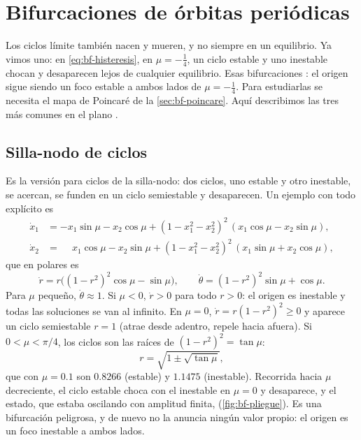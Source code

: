 \section{Bifurcaciones de órbitas periódicas}
\label{sec:bf-ciclos}

Los ciclos límite también nacen y mueren, y no siempre en un equilibrio. Ya vimos uno: en \eqref{eq:bf-histeresis}, en $\mu=-\tfrac14$, un ciclo estable y uno inestable chocan y desaparecen lejos de cualquier equilibrio. Esas bifurcaciones : el origen sigue siendo un foco estable a ambos lados de $\mu=-\tfrac14$. Para estudiarlas se necesita el mapa de Poincaré de la \cref{sec:bf-poincare}. Aquí describimos las tres más comunes en el plano \citep[\S8.4]{Str15}.

\subsection{Silla-nodo de ciclos}

Es la versión para ciclos de la silla-nodo: dos ciclos, uno estable y otro inestable, se acercan, se funden en un ciclo semiestable y desaparecen. Un ejemplo con todo explícito es \citep[cap.~7]{Sas99}
\begin{equation}
\begin{aligned}
  \dot x_1&=-x_1\sin\mu-x_2\cos\mu+(1-x_1^2-x_2^2)^2\,(x_1\cos\mu-x_2\sin\mu),\\
  \dot x_2&=\phantom{-}x_1\cos\mu-x_2\sin\mu+(1-x_1^2-x_2^2)^2\,(x_1\sin\mu+x_2\cos\mu),
\end{aligned}
\label{eq:bf-pliegue}
\end{equation}
que en polares es
\[
  \dot r=r\bigl((1-r^2)^2\cos\mu-\sin\mu\bigr),\qquad \dot\theta=(1-r^2)^2\sin\mu+\cos\mu .
\]
Para $\mu$ pequeño, $\dot\theta\approx1$. Si $\mu<0$, $\dot r>0$ para todo $r>0$: el origen es inestable y todas las soluciones se van al infinito. En $\mu=0$, $\dot r=r(1-r^2)^2\ge0$ y aparece un ciclo semiestable $r=1$ (atrae desde adentro, repele hacia afuera). Si $0<\mu<\pi/4$, los ciclos son las raíces de $(1-r^2)^2=\tan\mu$:
\[
  r=\sqrt{1\pm\sqrt{\tan\mu}} ,
\]
que con $\mu=0.1$ son $0.8266$ (estable) y $1.1475$ (inestable). Recorrida hacia $\mu$ decreciente, el ciclo estable choca con el inestable en $\mu=0$ y desaparece, y el estado, que estaba oscilando con amplitud finita,  (\cref{fig:bf-pliegue}). Es una bifurcación peligrosa, y de nuevo no la anuncia ningún valor propio: el origen es un foco inestable a ambos lados.

